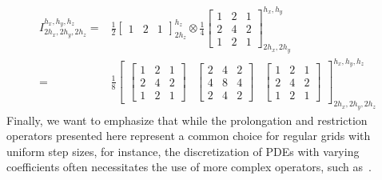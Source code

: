 \begin{equation}
	\begin{split}
		I_{2h_x, 2h_y, 2h_z}^{h_x, h_y, h_z} = & \frac{1}{2} \begin{bmatrix}
			1 & 2 & 1
		\end{bmatrix}_{2h_z}^{h_z} \otimes 
		\frac{1}{4} 
		\begin{bmatrix}
			1 & 2 & 1 \\
			2 & 4 & 2 \\
			1 & 2 & 1
		\end{bmatrix}_{2h_x,2h_y}^{h_x,h_y} \\
		= & \frac{1}{8} \begin{bmatrix}
			\begin{bmatrix}
				1 & 2 & 1 \\
				2 & 4 & 2 \\
				1 & 2 & 1
			\end{bmatrix}&	\begin{bmatrix}
				2 & 4 & 2 \\
				4 & 8 & 4 \\
				2 & 4 & 2
			\end{bmatrix} &
			\begin{bmatrix}
				1 & 2 & 1 \\
				2 & 4 & 2 \\
				1 & 2 & 1
			\end{bmatrix}
		\end{bmatrix}_{2h_x,2h_y,2h_z}^{h_x,h_y,h_z}
	\end{split}
\end{equation}
Finally, we want to emphasize that while the prolongation and restriction operators presented here represent a common choice for regular grids with uniform step sizes, for instance, the discretization of PDEs with varying coefficients often necessitates the use of more complex operators, such as~\cite{dendy1982black}.

